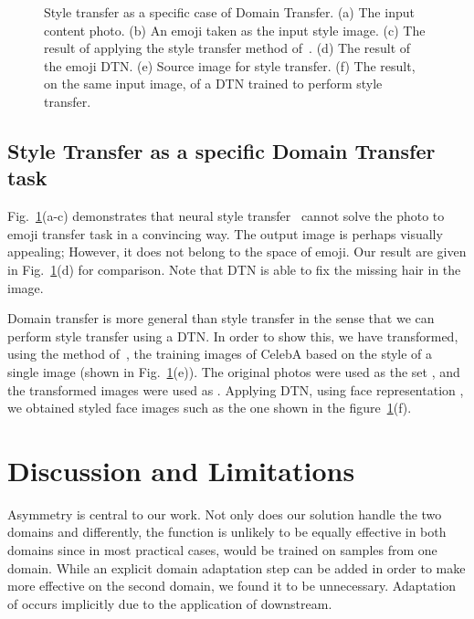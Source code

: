 \documentclass{article} \usepackage{iclr2017_conference,times}
\begin{document}
\begin{figure}[t]
\centering
{}

\caption{\label{fig:styletransfer}Style transfer as a specific case of Domain Transfer. (a) The input content photo. (b) An emoji taken as the input style image. (c) The result of applying the style transfer method of~\cite{styletransfer}.  (d) The result of the emoji DTN.  (e)  Source image for style transfer. (f) The result, on the same input image, of a DTN trained to perform style transfer.}
\end{figure}

\subsection{Style Transfer as a specific Domain Transfer task}

Fig.~\ref{fig:styletransfer}(a-c) demonstrates that neural style transfer~\cite{styletransfer} cannot solve the photo to emoji transfer task in a convincing way. The output image is perhaps visually appealing; However, it does not belong to the space  of emoji. Our result are given in Fig.~\ref{fig:styletransfer}(d) for comparison. Note that DTN is able to fix the missing hair in the image.

Domain transfer is more general than style transfer in the sense that we can perform style transfer using a DTN. In order to show this, we have transformed, using the method of~\cite{Johnson2016Perceptual}, the training images of CelebA based on the style of a single image (shown in Fig.~\ref{fig:styletransfer}(e)). The original photos were used as the set , and the transformed images were used as . Applying DTN, using face representation , we obtained styled face images such as the one shown in the figure~\ref{fig:styletransfer}(f).

\section{Discussion and Limitations}
\label{sec:conclusions}
Asymmetry is central to our work. Not only does our solution handle the two domains  and  differently, the function  is unlikely to be equally effective in both domains since in most practical cases,  would be trained on samples from one domain. While an explicit domain adaptation step can be added in order to make  more effective on the second domain, we found it to be unnecessary. Adaptation of  occurs implicitly due to the application of  downstream. 
\end{document}
